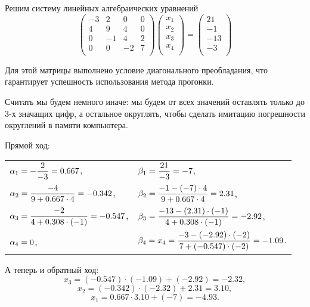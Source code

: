 \documentclass{article}
\begin{document}
\begin{example}
	Решим систему линейных алгебраических уравнений
	\[
		\begin{pmatrix}
			-3	& 2	& 0	& 0	\\
			4	& 9	& 4	& 0	\\
			0	& -1	& 4	& 2	\\
			0	& 0	& -2	& 7	\\
		\end{pmatrix}
		\begin{pmatrix}
			x_1 \\
			x_2 \\
			x_3 \\
			x_4 \\
		\end{pmatrix}
		=
		\begin{pmatrix}
			21  \\
			-1  \\
			-13 \\
			-3  \\
		\end{pmatrix}
	\]

	Для этой матрицы выполнено условие диагонального преобладания, что
	гарантирует успешность использования метода прогонки.

	Считать мы будем немного иначе: мы будем от всех значений оставлять
	только до 3-х значащих цифр, а остальное округлять, чтобы сделать
	имитацию погрешности округлений в памяти компьютера.

	Прямой ход:

	\begin{tabular}{*{2}{l}}
		\vspace{4mm}
		$\mathlarger{\alpha_1=-\frac{2}{-3}=0.667}$, &
			$\mathlarger{\beta_1=\frac{21}{-3}=-7}$, \\
		\vspace{4mm}
		$\mathlarger{\alpha_2=\frac{-4}{9+0.667\cdot 4}}=-0.342$, &
			$\mathlarger{\beta_2=\frac{-1-(-7)\cdot 4}{9+0.667\cdot 4}=
			2.31}$, \\
		\vspace{4mm}
		$\mathlarger{\alpha_3=\frac{-2}{4+0.308\cdot (-1)}}=-0.547$, &
			$\mathlarger{\beta_3=\frac{-13-(2.31)\cdot (-1)}
			{4+0.308\cdot (-1)}=-2.92}$, \\
		$\mathlarger{\alpha_4=0}$, &
			$\mathlarger{\beta_4=x_4=\frac{-3-(-2.92)\cdot (-2)}
			{7+(-0.547)\cdot (-2)}=-1.09}$. \\
	\end{tabular}

	А теперь и обратный ход:
	\[x_3=(-0.547)\cdot (-1.09)+(-2.92)=-2.32,\]
	\[x_2=(-0.342)\cdot (-2.32)+2.31=3.10,\]
	\[x_1=0.667\cdot 3.10+(-7)=-4.93.\]


\end{example}
\end{document}
